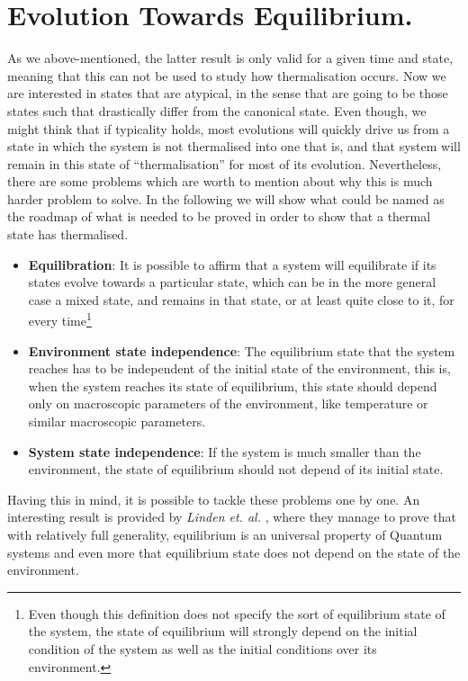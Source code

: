 \section{Evolution Towards Equilibrium.}
As we above-mentioned, the latter result is only valid for a given time and state, meaning that this can not be used to study how thermalisation occurs. Now we are interested in states that are atypical, in the sense that are going to be those states such that drastically differ from the canonical state. Even though, we might think that if typicality holds, most evolutions will quickly drive us from a state in which the system is not thermalised into one that is, and that system will remain in this state of ``thermalisation'' for most of its evolution. Nevertheless, there are some problems which are worth to mention about why this is much harder problem to solve. In the following we will show what could be named as the roadmap of what is needed to be proved in order to show that a thermal state has thermalised.
\begin{itemize}
\item \textbf{Equilibration}: It is possible to affirm that a system will equilibrate if its states evolve towards a particular state, which can be in the more general case a mixed state, and remains in that state, or at least quite close to it, for every time\footnote{Even though this definition does not specify the sort of equilibrium state of the system, the state of equilibrium will strongly depend on the initial condition of the system as well as the initial conditions over its environment. }
\item \textbf{Environment state independence}: The equilibrium state that the system reaches has to be independent of the initial state of the environment, this is, when the system reaches its state of equilibrium, this state should depend only on macroscopic parameters of the environment, like temperature or similar macroscopic parameters.
\item \textbf{System state independence}: If the system is much smaller than the environment, the state of equilibrium should not depend of its initial state.
\end{itemize}
Having this in mind, it is possible to tackle these problems one by one. An interesting result is provided by \textit{Linden et. al.}  \cite{linden_quantum_2009}, where they manage to prove that with relatively full generality, equilibrium is an universal property of Quantum systems and even more that equilibrium state does not depend on the state of the environment.\\

